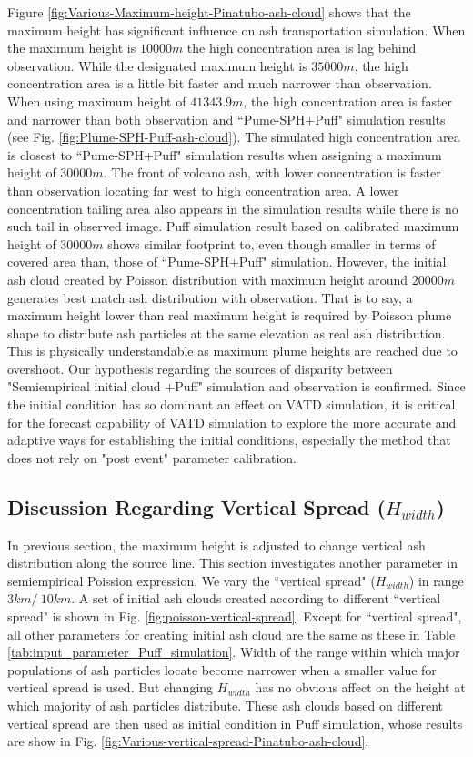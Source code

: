 \documentclass[draft,linenumbers]{agujournal2019}
\begin{document}
Figure \ref{fig:Various-Maximum-height-Pinatubo-ash-cloud} shows that the maximum height has significant influence on ash transportation simulation. When the maximum height is $10000 m$ the high concentration area is lag behind observation. While the designated maximum height is $35000 m$, the high concentration area is a little bit faster and much narrower than observation. When using maximum height of $41343.9 m$, the high concentration area is faster and narrower than both observation and ``Pume-SPH+Puff" simulation results (see Fig. \ref{fig:Plume-SPH-Puff-ash-cloud}). The simulated high concentration area is closest to ``Pume-SPH+Puff" simulation results when assigning a maximum height of $30000 m$. The front of volcano ash, with lower concentration is faster than observation locating far west to high concentration area. A lower concentration tailing area also appears in the simulation results while there is no such tail in observed image. Puff simulation result based on calibrated maximum height of $30000 m$ shows similar footprint to, even though smaller in terms of covered area than, those of ``Pume-SPH+Puff" simulation. However, the initial ash cloud created by Poisson distribution with maximum height around  $20000 m$ generates best match ash distribution with observation. That is to say, a maximum height lower than real maximum height is required by Poisson plume shape to distribute ash particles at the same elevation as real ash distribution. This is physically understandable as maximum plume heights are reached due to overshoot. 
Our hypothesis regarding the sources of disparity between "Semiempirical initial cloud +Puff" simulation and observation is confirmed. Since the initial condition has so dominant an effect on VATD simulation, it is critical for the forecast capability of VATD simulation to explore the more accurate and adaptive ways for establishing the initial conditions, especially the method that does not rely on "post event" parameter calibration.

\subsection{Discussion Regarding Vertical Spread ($H_{width}$)}
In previous section, the maximum height is adjusted to change vertical ash distribution along the source line. This section investigates another parameter in semiempirical Poission expression. We vary the ``vertical spread" ($H_{width}$) in range $3 km /~ 10 km$. A set of initial ash clouds created according to different ``vertical spread" is shown in Fig. \ref{fig:poisson-vertical-spread}. Except for ``vertical spread", all other parameters for creating initial ash cloud are the same as these in Table \ref{tab:input_parameter_Puff_simulation}. Width of the range within which major populations of ash particles locate become narrower when a smaller value for vertical spread is used. But changing $H_{width}$ has no obvious affect on the height at which majority of ash particles distribute. These ash clouds based on different vertical spread are then used as initial condition in Puff simulation, whose results are show in Fig. \ref{fig:Various-vertical-spread-Pinatubo-ash-cloud}.
\end{document}
